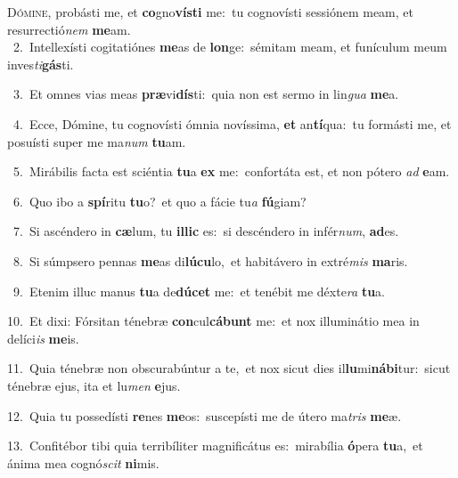 \lettrine{\initial\textcolor{\initialcolor}{D}}{ómine,} probásti me, et \textbf{co}\-gno\-\textbf{vís}\-\textbf{ti} me:~\star tu cognovísti sessiónem meam, et resurrectió\textit{nem} \textbf{me}\-am.\\
{\numbfont\textcolor{\numbcolor}{~2.}}~Intellexísti cogitatiónes \textbf{me}\-as de \textbf{lon}\-ge:~\star sémitam meam, et funículum meum inves\-\textit{ti}\-\textbf{gás}ti.\par
{\numbfont\textcolor{\numbcolor}{~3.}}~Et omnes vias meas \textbf{præ}\-vi\-\textbf{dís}\-ti:~\star quia non est sermo in lin\textit{gua} \textbf{me}\-a.\par
{\numbfont\textcolor{\numbcolor}{~4.}}~Ecce, Dómine, tu cognovísti ómnia novíssima, \textbf{et} an\-\textbf{tí}\-qua:~\star tu formásti me, et posuísti super me ma\textit{num} \textbf{tu}\-am.\par
{\numbfont\textcolor{\numbcolor}{~5.}}~Mirábilis facta est sciéntia \textbf{tu}\-a \textbf{ex} me:~\star confortáta est, et non pótero \textit{ad} \textbf{e}\-am.\par
{\numbfont\textcolor{\numbcolor}{~6.}}~Quo ibo a \textbf{spí}\-ritu \textbf{tu}\-o?~\star et quo a fácie tu\textit{a} \textbf{fú}\-giam?\par
{\numbfont\textcolor{\numbcolor}{~7.}}~Si ascéndero in \textbf{cæ}\-lum, tu \textbf{il}\-\textbf{lic} es:~\star si descéndero in infér\-\textit{num}\-, \textbf{ad}\-es.\par
{\numbfont\textcolor{\numbcolor}{~8.}}~Si súmpsero pennas \textbf{me}\-as di\-\textbf{lú}\-\textbf{cu}lo,~\star et habitávero in extré\textit{mis} \textbf{ma}\-ris.\par
{\numbfont\textcolor{\numbcolor}{~9.}}~Etenim illuc manus \textbf{tu}\-a de\-\textbf{dú}\-\textbf{cet} me:~\star et tenébit me déxte\textit{ra} \textbf{tu}\-a.\par
{\numbfont\textcolor{\numbcolor}{10.}}~Et dixi: Fórsitan ténebræ \textbf{con}\-cul\-\textbf{cá}\-\textbf{bunt} me:~\star et nox illuminátio mea in delíci\textit{is} \textbf{me}\-is.\par
{\numbfont\textcolor{\numbcolor}{11.}}~Quia ténebræ non obscurabúntur a te,~\dagger et nox sicut dies il\-\textbf{lu}\-mi\-\textbf{ná}\-\textbf{bi}tur:~\star sicut ténebræ ejus, ita et lu\textit{men} \textbf{e}\-jus.\par
{\numbfont\textcolor{\numbcolor}{12.}}~Quia tu possedísti \textbf{re}\-nes \textbf{me}\-os:~\star suscepísti me de útero ma\textit{tris} \textbf{me}\-æ.\par
{\numbfont\textcolor{\numbcolor}{13.}}~Confitébor tibi quia terribíliter magnificátus es:~\dagger mirabília \textbf{ó}\-pera \textbf{tu}\-a,~\star et ánima mea cognó\textit{scit} \textbf{ni}\-mis.\par
